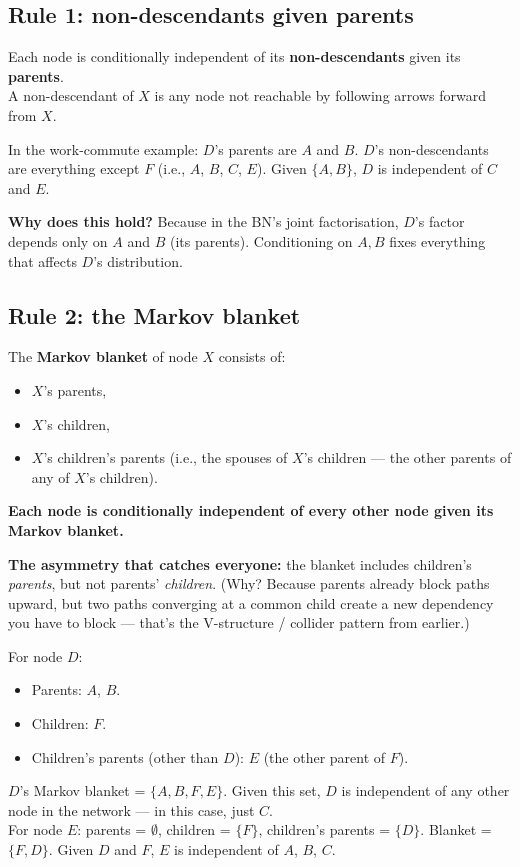 \documentclass[11pt, a4paper]{article}
\begin{document}
\subsection{Rule 1: non-descendants given parents}

\begin{defbox}
Each node is conditionally independent of its \textbf{non-descendants} given its \textbf{parents}.\\[0.3em]
A non-descendant of $X$ is any node not reachable by following arrows forward from $X$.
\end{defbox}

In the work-commute example: $D$'s parents are $A$ and $B$. $D$'s non-descendants are everything except $F$ (i.e., $A$, $B$, $C$, $E$). Given $\{A, B\}$, $D$ is independent of $C$ and $E$.

\textbf{Why does this hold?} Because in the BN's joint factorisation, $D$'s factor depends only on $A$ and $B$ (its parents). Conditioning on $A, B$ fixes everything that affects $D$'s distribution.

\subsection{Rule 2: the Markov blanket}

\begin{defbox}
The \textbf{Markov blanket} of node $X$ consists of:
\begin{itemize}[itemsep=0pt, topsep=0pt]
  \item $X$'s parents,
  \item $X$'s children,
  \item $X$'s children's parents (i.e., the spouses of $X$'s children — the other parents of any of $X$'s children).
\end{itemize}
\textbf{Each node is conditionally independent of every other node given its Markov blanket.}
\end{defbox}

\textbf{The asymmetry that catches everyone:} the blanket includes children's \emph{parents}, but not parents' \emph{children}. (Why? Because parents already block paths upward, but two paths converging at a common child create a new dependency you have to block — that's the V-structure / collider pattern from earlier.)

\begin{exbox}
For node $D$:
\begin{itemize}[itemsep=0pt, topsep=0pt]
  \item Parents: $A$, $B$.
  \item Children: $F$.
  \item Children's parents (other than $D$): $E$ (the other parent of $F$).
\end{itemize}
$D$'s Markov blanket = $\{A, B, F, E\}$. Given this set, $D$ is independent of any other node in the network — in this case, just $C$.\\[0.3em]
For node $E$: parents = $\emptyset$, children = $\{F\}$, children's parents = $\{D\}$. Blanket = $\{F, D\}$. Given $D$ and $F$, $E$ is independent of $A$, $B$, $C$.
\end{exbox}
\end{document}
